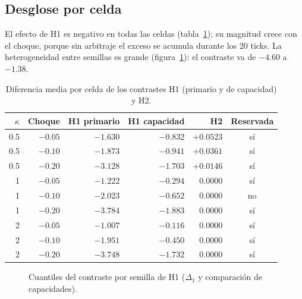 \subsection{Desglose por celda}

El efecto de H1 es negativo en todas las celdas (tabla~\ref{tab:celdas}); su magnitud crece con el choque, porque sin arbitraje el exceso se acumula durante los 20 ticks. La heterogeneidad entre semillas es grande (figura~\ref{fig:cuantiles}): el contraste va de $-4.60$ a $-1.38$.

\begin{table}[htbp]
\centering
\caption{Diferencia media por celda de los contrastes H1 (primario y de capacidad) y H2.}
\label{tab:celdas}
\small
\begin{tabular}{@{}rrrrrc@{}}
\toprule
$\kappa$ & Choque & H1 primario & H1 capacidad & H2 & Reservada \\
\midrule
0.5 & $-0.05$ & $-1.630$ & $-0.832$ & $+0.0523$ & sí \\
0.5 & $-0.10$ & $-1.873$ & $-0.941$ & $+0.0361$ & sí \\
0.5 & $-0.20$ & $-3.128$ & $-1.703$ & $+0.0146$ & sí \\
1 & $-0.05$ & $-1.222$ & $-0.294$ & $0.0000$ & sí \\
1 & $-0.10$ & $-2.023$ & $-0.652$ & $0.0000$ & no \\
1 & $-0.20$ & $-3.784$ & $-1.883$ & $0.0000$ & sí \\
2 & $-0.05$ & $-1.007$ & $-0.116$ & $0.0000$ & sí \\
2 & $-0.10$ & $-1.951$ & $-0.450$ & $0.0000$ & sí \\
2 & $-0.20$ & $-3.748$ & $-1.732$ & $0.0000$ & sí \\
\bottomrule
\end{tabular}
\end{table}

\begin{figure}[htbp]
\centering
{}
\caption{Cuantiles del contraste por semilla de H1 ($\Delta_1$ y comparación de capacidades).}
\label{fig:cuantiles}
\end{figure}

